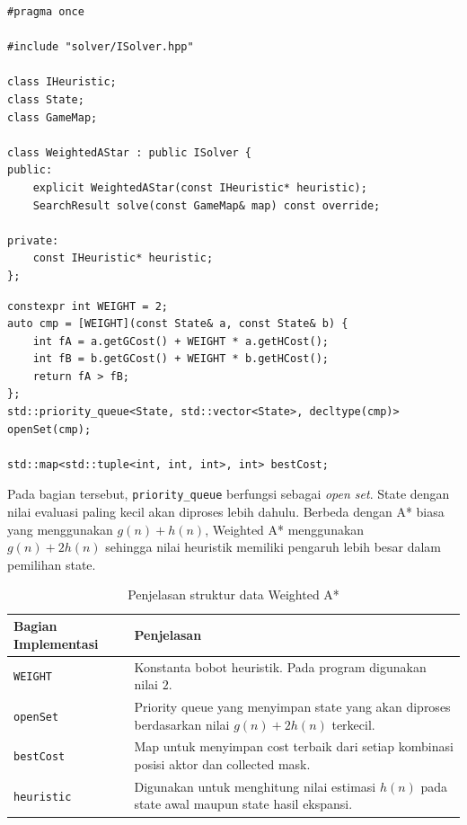 \begin{tcolorbox}[
	colback=purple!5,
	colframe=purple!60!black,
	title=\textbf{Potongan Source Code Asli: Deklarasi \texttt{WeightedAStar.hpp}},
	arc=2mm,
	boxrule=0.8pt
]
\small
\begin{verbatim}
#pragma once

#include "solver/ISolver.hpp"

class IHeuristic;
class State;
class GameMap;

class WeightedAStar : public ISolver {
public:
    explicit WeightedAStar(const IHeuristic* heuristic);
    SearchResult solve(const GameMap& map) const override;

private:
    const IHeuristic* heuristic;
};
\end{verbatim}
\end{tcolorbox}

\begin{tcolorbox}[
	colback=purple!5,
	colframe=purple!60!black,
	title=\textbf{Potongan Source Code Asli: Bobot dan Prioritas Weighted A*},
	arc=2mm,
	boxrule=0.8pt
]
\small
\begin{verbatim}
constexpr int WEIGHT = 2;
auto cmp = [WEIGHT](const State& a, const State& b) {
    int fA = a.getGCost() + WEIGHT * a.getHCost();
    int fB = b.getGCost() + WEIGHT * b.getHCost();
    return fA > fB;
};
std::priority_queue<State, std::vector<State>, decltype(cmp)> openSet(cmp);

std::map<std::tuple<int, int, int>, int> bestCost;
\end{verbatim}
\end{tcolorbox}

Pada bagian tersebut, \texttt{priority\_queue} berfungsi sebagai \textit{open set}. 
State dengan nilai evaluasi paling kecil akan diproses lebih dahulu. 
Berbeda dengan A* biasa yang menggunakan $g(n)+h(n)$, Weighted A* menggunakan $g(n)+2h(n)$ sehingga nilai heuristik memiliki pengaruh lebih besar dalam pemilihan state.

\begin{table}[H]
	\centering
	\caption{Penjelasan struktur data Weighted A*}
	\begin{tabular}{|p{4cm}|p{10cm}|}
		\hline
		\rowcolor{purple!15}
		\textbf{Bagian Implementasi} & \textbf{Penjelasan} \\
		\hline
		\texttt{WEIGHT} & Konstanta bobot heuristik. Pada program digunakan nilai $2$. \\
		\hline
		\texttt{openSet} & Priority queue yang menyimpan state yang akan diproses berdasarkan nilai $g(n)+2h(n)$ terkecil. \\
		\hline
		\texttt{bestCost} & Map untuk menyimpan cost terbaik dari setiap kombinasi posisi aktor dan collected mask. \\
		\hline
		\texttt{heuristic} & Digunakan untuk menghitung nilai estimasi $h(n)$ pada state awal maupun state hasil ekspansi. \\
		\hline
	\end{tabular}
\end{table}

